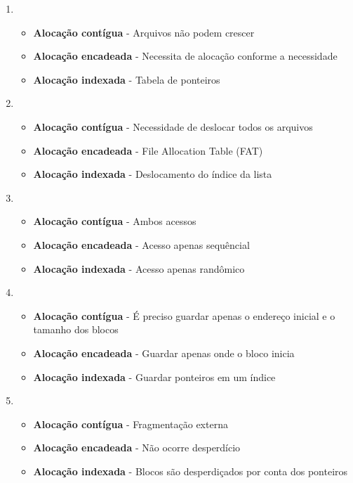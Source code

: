 \begin{question}

	\begin{enumerate}[label= \textbf{\alph*}) ]
		\item 
		\begin{itemize}
			\item \textbf{Alocação contígua} - Arquivos não podem crescer
            \item \textbf{Alocação encadeada} - Necessita de alocação conforme a necessidade
            \item \textbf{Alocação indexada} - Tabela de ponteiros
		\end{itemize}
		\item 
		\begin{itemize}
			\item \textbf{Alocação contígua} - Necessidade de deslocar todos os arquivos
            \item \textbf{Alocação encadeada} - File Allocation Table (FAT)
            \item \textbf{Alocação indexada} - Deslocamento do índice da lista
		\end{itemize}
		\item 
		\begin{itemize}
			\item \textbf{Alocação contígua} - Ambos acessos
            \item \textbf{Alocação encadeada} - Acesso apenas sequêncial
            \item \textbf{Alocação indexada} - Acesso apenas randômico 
		\end{itemize}
		\item 
		\begin{itemize}
			\item \textbf{Alocação contígua} - É preciso guardar apenas o endereço inicial e o tamanho dos blocos
            \item \textbf{Alocação encadeada} - Guardar apenas onde o bloco inicia 
            \item \textbf{Alocação indexada} - Guardar ponteiros em um índice 
		\end{itemize}
		\item 
		\begin{itemize}
			\item \textbf{Alocação contígua} - Fragmentação externa
            \item \textbf{Alocação encadeada} - Não ocorre desperdício
            \item \textbf{Alocação indexada} - Blocos são desperdiçados por conta dos ponteiros
		\end{itemize}
	\end{enumerate}
\end{question}
